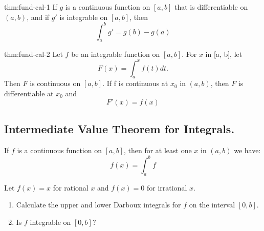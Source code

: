 \documentclass{notes}
\begin{document}
\begin{theorem}{thm:fund-cal-1}
If $g$ is a continuous function on $[a, b]$ that is differentiable on $(a, b)$,
and if $g'$ is integrable on $[a, b]$, then
$$\int_{a}^{b} g' = g(b) - g(a)$$
\end{theorem}
\begin{theorem}{thm:fund-cal-2}
	Let $f$ be an integrable function on $[a, b]$. For $x$ in [a, b], let
	$$F(x) = \int_{a}^{x}f(t)dt.$$
	Then $F$ is continuous on $[a, b]$. If f is continuous at $x_0$ in $(a, b)$, then
	$F $ is differentiable at $x_0$ and
	$$F'(x) = f(x)$$
\end{theorem}


\subsection{Intermediate Value Theorem for Integrals.}

\begin{theorem}{}
	If $f$ is a continuous function on $[a, b]$, then for at least one $x$ in $(a, b)$
	we have:
	\[  f(x) = \int_{a}^{b} f   \]
\end{theorem}


\begin{problem}
	Let $f(x) = x$ for rational $x$ and $f(x) = 0$ for irrational $x$.
	\begin{enumerate}
		\item
		Calculate the upper and lower Darboux integrals for $f$ on the
		interval $[0, b]$.
		\item 
		Is $f$ integrable on $[0, b]$?
	\end{enumerate}
\end{problem}
\end{document}
